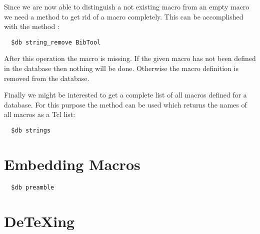Since we are now able to distinguish a not existing macro from an empty
macro we need a method to get rid of a macro completely. This can be
accomplished with the method :
\begin{verbatim}
  $db string_remove BibTool
\end{verbatim}%
After this operation the macro  is missing. If the given
macro has not been defined in the database then nothing will be done.
Otherwise the macro definition is removed from the database.

Finally we might be interested to get a complete list of all macros
defined for a database. For this purpose the method  can be used which returns the names of all macros as a Tcl
list: 
\begin{verbatim}
  $db strings
\end{verbatim}%


\section{Embedding \LaTeXTeX{} Macros}

\begin{verbatim}
  $db preamble
\end{verbatim}%

\INCOMPLETE



\section{De\TeX ing}

